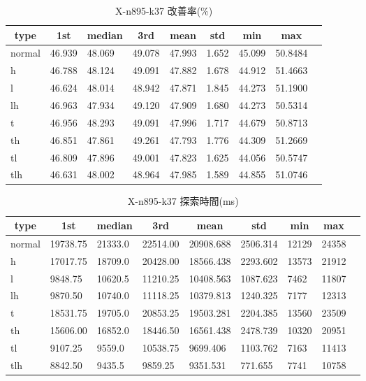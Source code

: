 \begin{table}[htbp]
    \caption{X-n895-k37 改善率(\%)}
    \begin{tabular}{|l|l|l|l|l|l|l|l|l|}\hline
    \multicolumn{1}{|c|}{\textbf{type}}
    &\multicolumn{1}{|c|}{\textbf{1st}}
    &\multicolumn{1}{c|}{\textbf{median}}
    &\multicolumn{1}{c|}{\textbf{3rd}}
    &\multicolumn{1}{c|}{\textbf{mean}}
    &\multicolumn{1}{c|}{\textbf{std}}
    &\multicolumn{1}{c|}{\textbf{min}}
    &\multicolumn{1}{c|}{\textbf{max}}\\\hline
	normal & 46.939 & 48.069 & 49.078 & 47.993 & 1.652 & 45.099 & 50.8484\\\hline
	h & 46.788 & 48.124 & 49.091 & 47.882 & 1.678 & 44.912 & 51.4663\\\hline
	l & 46.624 & 48.014 & 48.942 & 47.871 & 1.845 & 44.273 & 51.1900\\\hline
	lh & 46.963 & 47.934 & 49.120 & 47.909 & 1.680 & 44.273 & 50.5314\\\hline
	t & 46.956 & 48.293 & 49.091 & 47.996 & 1.717 & 44.679 & 50.8713\\\hline
	th & 46.851 & 47.861 & 49.261 & 47.793 & 1.776 & 44.309 & 51.2669\\\hline
	tl & 46.809 & 47.896 & 49.001 & 47.823 & 1.625 & 44.056 & 50.5747\\\hline
	tlh & 46.631 & 48.002 & 48.964 & 47.985 & 1.589 & 44.855 & 51.0746\\\hline
	\end{tabular}
\end{table}
\begin{table}[htbp]
    \caption{X-n895-k37 探索時間(ms)}
    \begin{tabular}{|l|l|l|l|l|l|l|l|l|}\hline
    \multicolumn{1}{|c|}{\textbf{type}}
    &\multicolumn{1}{|c|}{\textbf{1st}}
    &\multicolumn{1}{c|}{\textbf{median}}
    &\multicolumn{1}{c|}{\textbf{3rd}}
    &\multicolumn{1}{c|}{\textbf{mean}}
    &\multicolumn{1}{c|}{\textbf{std}}
    &\multicolumn{1}{c|}{\textbf{min}}
    &\multicolumn{1}{c|}{\textbf{max}}\\\hline
	normal & 19738.75 & 21333.0 & 22514.00 & 20908.688 & 2506.314 & 12129 & 24358\\\hline
	h & 17017.75 & 18709.0 & 20428.00 & 18566.438 & 2293.602 & 13573 & 21912\\\hline
	l & 9848.75 & 10620.5 & 11210.25 & 10408.563 & 1087.623 & 7462 & 11807\\\hline
	lh & 9870.50 & 10740.0 & 11118.25 & 10379.813 & 1240.325 & 7177 & 12313\\\hline
	t & 18531.75 & 19705.0 & 20853.25 & 19503.281 & 2204.385 & 13560 & 23509\\\hline
	th & 15606.00 & 16852.0 & 18446.50 & 16561.438 & 2478.739 & 10320 & 20951\\\hline
	tl & 9107.25 & 9559.0 & 10538.75 & 9699.406 & 1103.762 & 7163 & 11413\\\hline
	tlh & 8842.50 & 9435.5 & 9859.25 & 9351.531 & 771.655 & 7741 & 10758\\\hline
	\end{tabular}
\end{table}
